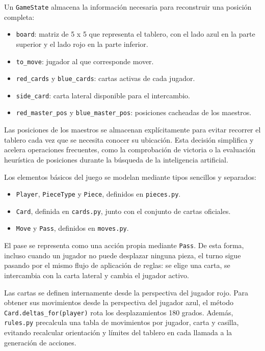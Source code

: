 Un \texttt{GameState} almacena la información necesaria para reconstruir una posición completa:

\begin{itemize}
    \item \texttt{board}: matriz de 5 x 5 que representa el tablero, con el lado azul en la parte superior y el lado rojo en la parte inferior.
    \item \texttt{to\_move}: jugador al que corresponde mover.
    \item \texttt{red\_cards} y \texttt{blue\_cards}: cartas activas de cada jugador.
    \item \texttt{side\_card}: carta lateral disponible para el intercambio.
    \item \texttt{red\_master\_pos} y \texttt{blue\_master\_pos}: posiciones cacheadas de los maestros.
\end{itemize}

Las posiciones de los maestros se almacenan explícitamente para evitar recorrer el tablero cada vez que se necesita conocer su ubicación. Esta decisión simplifica y acelera operaciones frecuentes, como la comprobación de victoria o la evaluación heurística de posiciones durante la búsqueda de la inteligencia artificial.

Los elementos básicos del juego se modelan mediante tipos sencillos y separados:

\begin{itemize}
    \item \texttt{Player}, \texttt{PieceType} y \texttt{Piece}, definidos en \texttt{pieces.py}.
    \item \texttt{Card}, definida en \texttt{cards.py}, junto con el conjunto de cartas oficiales.
    \item \texttt{Move} y \texttt{Pass}, definidos en \texttt{moves.py}.
\end{itemize}

El pase se representa como una acción propia mediante \texttt{Pass}. De esta forma, incluso cuando un jugador no puede desplazar ninguna pieza, el turno sigue pasando por el mismo flujo de aplicación de reglas: se elige una carta, se intercambia con la carta lateral y cambia el jugador activo.

Las cartas se definen internamente desde la perspectiva del jugador rojo. Para obtener sus movimientos desde la perspectiva del jugador azul, el método \texttt{Card.deltas\_for(player)} rota los desplazamientos 180 grados. Además, \texttt{rules.py} precalcula una tabla de movimientos por jugador, carta y casilla, evitando recalcular orientación y límites del tablero en cada llamada a la generación de acciones.

